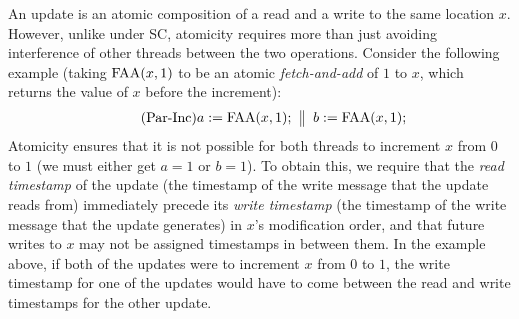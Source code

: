 An update is an atomic composition of a read and a write to the same
location $x$. However, unlike under SC, atomicity requires more than
just avoiding interference of other threads between the two operations.
Consider the following example
(taking $\textrm{FAA}({x,1})$ to be an atomic \emph{fetch-and-add} of $1$ to $x$,
which returns the value of $x$ before the increment):
\begin{equation}\label{eq:par-inc}\tag{Par-Inc}
\inarrII{ a:= \fai{x,1};}{b:=\fai{x,1};}
\end{equation}
Atomicity ensures that it is not possible for both threads to
increment $x$ from $0$ to $1$ (we must either get $a=1$ or $b=1$). To
obtain this, we require that the \emph{read timestamp} of the update
(\ie the timestamp of the write message that the update reads from)
immediately precede its \emph{write timestamp} (\ie the timestamp of
the write message that the update generates) in $x$'s modification
order, and that future writes to $x$ may not be assigned timestamps in
between them.  In the example above, if both of the updates were to
increment $x$ from $0$ to $1$, the write timestamp for one of the
updates would have to come between the read and write timestamps for
the other update.

